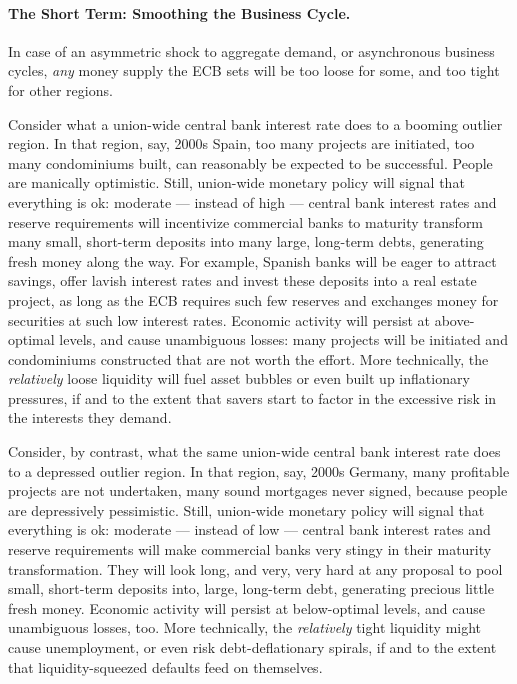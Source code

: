 \documentclass[11pt,a4paper,oneside,openright]{article}
\begin{document}
\paragraph[Short Term]{The Short Term: 
Smoothing the Business Cycle.}
In case of an asymmetric shock to aggregate demand, or asynchronous business cycles, \emph{any} money supply the \gls{ECB} sets will be too loose for some, and too tight for other regions. 

Consider what a union-wide central bank interest rate does to a booming outlier region. 
In that region, say, 2000s Spain, too many projects are initiated, too many condominiums built, can reasonably be expected to be successful. 
People are manically optimistic. 
Still, union-wide monetary policy will signal that everything is ok: 
moderate --- instead of high --- central bank interest rates and reserve requirements will incentivize commercial banks to maturity transform many small, short-term deposits into many large, long-term debts, generating fresh money along the way. 
For example, Spanish banks will be eager to attract savings, offer lavish interest rates and invest these deposits into a real estate project, as long as the \gls{ECB} requires such few reserves and exchanges money for securities at such low interest rates. 
Economic activity will persist at above-optimal levels, and cause unambiguous losses: 
many projects will be initiated and condominiums constructed that are not worth the effort. 
More technically, the \emph{relatively} loose liquidity will fuel asset bubbles or even built up inflationary pressures, if and to the extent that savers start to factor in the excessive risk in the interests they demand.

Consider, by contrast, what the same union-wide central bank interest rate does to a depressed outlier region. 
In that region, say, 2000s Germany, many profitable projects are not undertaken, many sound mortgages never signed, because people are depressively pessimistic. 
Still, union-wide monetary policy will signal that everything is ok: 
moderate --- instead of low --- central bank interest rates and reserve requirements will make commercial banks very stingy in their maturity transformation. 
They will look long, and very, very hard at any proposal to pool small, short-term deposits into, large, long-term debt, generating precious little fresh money. 
Economic activity will persist at below-optimal levels, and cause unambiguous losses, too. 
More technically, the \emph{relatively} tight liquidity might cause unemployment, or even risk debt-deflationary spirals, if and to the extent that liquidity-squeezed defaults feed on themselves.
\end{document}
